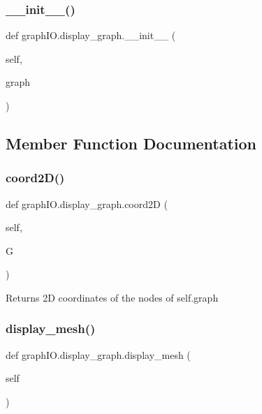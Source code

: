 \subsubsection{\+\_\+\+\_\+init\+\_\+\+\_\+()}
{\footnotesize\ttfamily def graph\+I\+O.\+display\+\_\+graph.\+\_\+\+\_\+init\+\_\+\+\_\+ (\begin{DoxyParamCaption}\item[{}]{self,  }\item[{}]{graph }\end{DoxyParamCaption})}



\subsection{Member Function Documentation}
\mbox{\label{classgraph_i_o_1_1display__graph_a332d64022b90bd947b73cb98570e6a43}} 
\subsubsection{coord2\+D()}
{\footnotesize\ttfamily def graph\+I\+O.\+display\+\_\+graph.\+coord2D (\begin{DoxyParamCaption}\item[{}]{self,  }\item[{}]{G }\end{DoxyParamCaption})}

\begin{DoxyVerb}Returns 2D coordinates of the nodes of self.graph
\end{DoxyVerb}
 \mbox{\label{classgraph_i_o_1_1display__graph_ab7c95142ba3a6606b44c122cbe6922b3}} 
\subsubsection{display\+\_\+mesh()}
{\footnotesize\ttfamily def graph\+I\+O.\+display\+\_\+graph.\+display\+\_\+mesh (\begin{DoxyParamCaption}\item[{}]{self }\end{DoxyParamCaption})}

